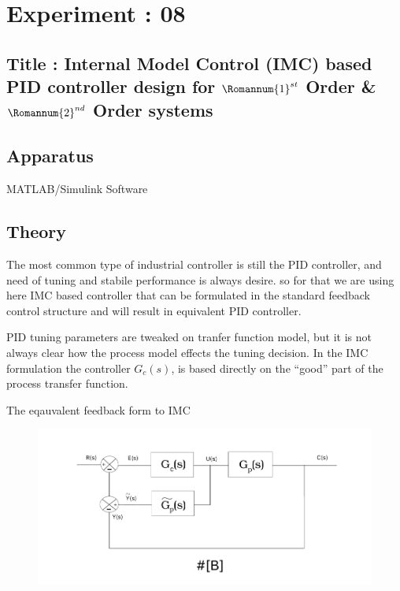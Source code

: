 \message{ !name(lab1.tex)}\documentclass[a4paper,12pt,openany]{book}
\begin{document}
\chapter{Experiment : 08}
\section{Title : Internal Model Control (IMC) based PID controller design for
  $\Romannum{1}^{st}$ Order \& $\Romannum{2}^{nd}$ Order systems}

\section{Apparatus}
MATLAB/Simulink Software

\section{Theory}
\label{sec:lab8_theory}
The most common type of industrial controller is still the PID controller, and 
need of tuning and stabile performance is always desire. so for that we are
using here IMC based controller that can be formulated in the standard feedback
control structure and will result in equivalent PID controller.

\par

PID tuning parameters are tweaked on tranfer function model, but it is not
always clear how the process model effects the tuning decision. In the IMC
formulation the controller $G_c(s)$, is based directly on the ``good'' part of
the process transfer function. \par

The eqauvalent feedback form to IMC
\begin{figure}[ht]
  \centering
  \includegraphics[scale=0.95]{l8p1.png}
  \end{figure}
\end{document}
